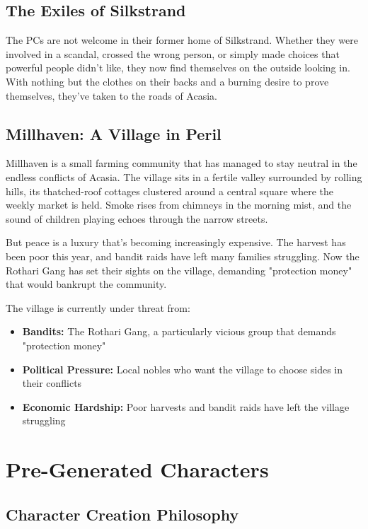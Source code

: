 \documentclass[11pt]{article}
\begin{document}
\subsection{The Exiles of Silkstrand}

The PCs are not welcome in their former home of Silkstrand. Whether they were involved in a scandal, crossed the wrong person, or simply made choices that powerful people didn't like, they now find themselves on the outside looking in. With nothing but the clothes on their backs and a burning desire to prove themselves, they've taken to the roads of Acasia.

\subsection{Millhaven: A Village in Peril}

Millhaven is a small farming community that has managed to stay neutral in the endless conflicts of Acasia. The village sits in a fertile valley surrounded by rolling hills, its thatched-roof cottages clustered around a central square where the weekly market is held. Smoke rises from chimneys in the morning mist, and the sound of children playing echoes through the narrow streets.

But peace is a luxury that's becoming increasingly expensive. The harvest has been poor this year, and bandit raids have left many families struggling. Now the Rothari Gang has set their sights on the village, demanding "protection money" that would bankrupt the community.

The village is currently under threat from:
\begin{itemize}
\item \textbf{Bandits:} The Rothari Gang, a particularly vicious group that demands "protection money"
\item \textbf{Political Pressure:} Local nobles who want the village to choose sides in their conflicts
\item \textbf{Economic Hardship:} Poor harvests and bandit raids have left the village struggling
\end{itemize}

\section{Pre-Generated Characters}

\subsection{Character Creation Philosophy}
\end{document}
